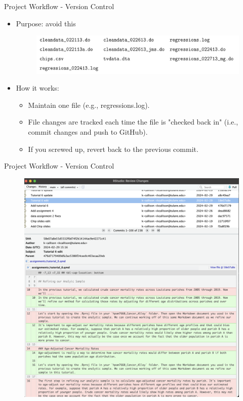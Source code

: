 \documentclass{beamer}
\begin{document}
\begin{frame}{Project Workflow - Version Control}
    \begin{itemize}
        \item Purpose: avoid this
            \begin{figure}
                \includegraphics[scale=0.55]{files.png}
            \end{figure}
        \item How it works:
            \begin{itemize}
                \item Maintain one file (e.g., regressions.log).
                \item File changes are tracked each time the file is "checked back in" (i.e., commit changes and push to GitHub).
                \item If you screwed up, revert back to the previous commit.
            \end{itemize}
    \end{itemize}
\end{frame}

\begin{frame}{Project Workflow - Version Control}
    \begin{figure}
        \includegraphics[scale=0.25]{version_control.png}
    \end{figure}    
\end{frame}
\end{document}
